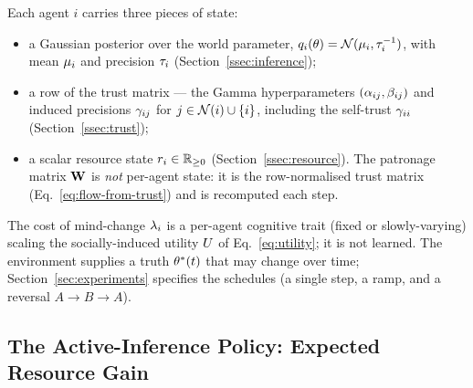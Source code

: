 Each agent $i$ carries three pieces of state:
\begin{itemize}
\item a Gaussian posterior over the world parameter,
  $q_i(\theta) = \mathcal{N}(\mu_i, \tau_i^{-1})$, with mean
  $\mu_i$ and precision $\tau_i$ (Section~\ref{ssec:inference});
\item a row of the trust matrix --- the Gamma hyperparameters
  $(\alpha_{ij}, \beta_{ij})$ and induced precisions
  $\gamma_{ij}$ for $j \in \mathcal{N}(i) \cup \{i\}$, including the
  self-trust $\gamma_{ii}$ (Section~\ref{ssec:trust});
\item a scalar resource state $r_{i} \in \mathbb{R}_{\geq 0}$
  (Section~\ref{ssec:resource}). The patronage matrix $\mathbf{W}$ is
  \emph{not} per-agent state: it is the row-normalised trust matrix
  (Eq.~\ref{eq:flow-from-trust}) and is recomputed each step.
\end{itemize}
The cost of mind-change $\lambda_{i}$ is a per-agent cognitive trait
(fixed or slowly-varying) scaling the socially-induced utility
$U$ of Eq.~\eqref{eq:utility}; it is not learned. The
environment supplies a truth $\theta^{*}(t)$ that may change over time;
Section~\ref{sec:experiments} specifies the schedules (a single step,
a ramp, and a reversal $A \!\to\! B \!\to\! A$).

\subsection{The Active-Inference Policy: Expected Resource Gain}
\label{ssec:policy}

